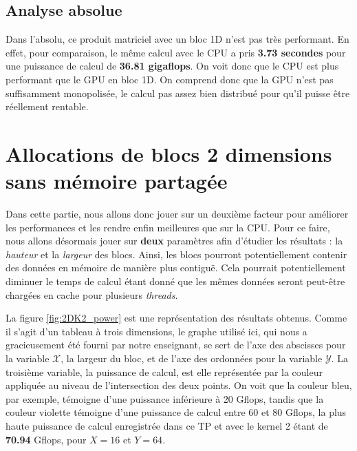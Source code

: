 \documentclass[	DIV=calc,%
							paper=a4,%
							fontsize=11pt%
							]{scrartcl}	 					%
\begin{document}
\subsection{Analyse absolue}
Dans l'absolu, ce produit matriciel avec un bloc 1D n'est pas très performant. En effet, pour comparaison, le même calcul avec le CPU a pris \textbf{3.73 secondes} pour une puissance de calcul de \textbf{36.81 gigaflops}. On voit donc que le CPU est plus performant que le GPU en bloc 1D. On comprend donc que la GPU n'est pas suffisamment monopolisée, le calcul pas assez bien distribué pour qu'il puisse être réellement rentable.

\section{Allocations de blocs 2 dimensions sans mémoire partagée}
Dans cette partie, nous allons donc jouer sur un deuxième facteur pour améliorer les performances et les rendre enfin meilleures que sur la CPU. Pour ce faire, nous allons désormais jouer sur \textbf{deux} paramètres afin d'étudier les résultats : la \textit{hauteur} et la \textit{largeur} des blocs. Ainsi, les blocs pourront potentiellement contenir des données en mémoire de manière plus contiguë. Cela pourrait potentiellement diminuer le temps de calcul étant donné que les mêmes données seront peut-être chargées en cache pour plusieurs \textit{threads}.\par
La figure \ref{fig:2DK2_power} est une représentation des résultats obtenus. Comme il s'agit d'un tableau à trois dimensions, le graphe utilisé ici, qui nous a gracieusement été fourni par notre enseignant, se sert de l'axe des abscisses pour la variable $\mathcal{X}$, la largeur du bloc, et de l'axe des ordonnées pour la variable $\mathcal{Y}$. La troisième variable, la puissance de calcul, est elle représentée par la couleur appliquée au niveau de l'intersection des deux points. On voit que la couleur bleu, par exemple, témoigne d'une puissance inférieure à 20 Gflops, tandis que la couleur violette témoigne d'une puissance de calcul entre 60 et 80 Gflops, la plus haute puissance de calcul enregistrée dans ce TP et avec le kernel 2 étant de \textbf{70.94} Gflops, pour $ X = 16 $ et $Y = 64$.\par
\end{document}
